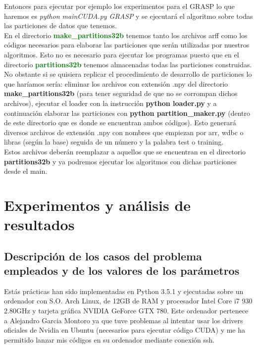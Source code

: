 \documentclass[10pt,a4paper]{article}
\begin{document}
Entonces para ejecutar por ejemplo los experimentos para el GRASP lo que haremos es \textit{python mainCUDA.py GRASP} y se ejecutará el algoritmo sobre todas las particiones de datos que tenemos.\\

En el directorio \textbf{\textcolor{green}{make\_partitions32b}} tenemos tanto los archivos arff como los códigos necesarios para elaborar las particiones que serán utilizadas por nuestros algoritmos. Esto no es necesario para ejecutar los programas puesto que en el directorio \textbf{\textcolor{green}{partitions32b}} tenemos almacenadas todas las particiones construidas. No obstante si se quisiera replicar el procedimiento de desarrollo de particiones lo que haríamos sería: eliminar los archivos con extensión .npy del directorio \textbf{make\_partitions32b} (para tener seguridad de que no se corrompan dichos archivos), ejecutar el loader con la instrucción \textbf{python loader.py} y a continuación elaborar las particiones con \textbf{python partition\_maker.py} (dentro de este directorio que es donde se encuentran ambos códigos). Esto generará diversos archivos de extensión .npy con nombres que empiezan por arr, wdbc o libras (según la base) seguida de un número y la palabra test o training.\\

Estos archivos deberán reemplazar a aquellos que se encuentran en el directorio \textbf{partitions32b} y ya podremos ejecutar los algoritmos con dichas particiones desde el main.\\

\newpage
\section{\color[rgb]{0.0,0.0,0.21}Experimentos y análisis de resultados}

\subsection{\color[rgb]{0.0,0.0,0.51}Descripción de los casos del problema empleados y de los valores de los parámetros}


Estás prácticas han sido implementadas en Python 3.5.1 y ejecutadas sobre un ordenador con S.O. Arch Linux, de 12GB de RAM y procesador Intel Core i7 930 2.80GHz y tarjeta gráfica NVIDIA GeForce GTX 780. Este ordenador pertenece a Alejandro Garcia Montoro ya que tuve problemas al intentar usar los drivers oficiales de Nvidia en Ubuntu (necesarios para ejecutar código CUDA) y me ha permitido lanzar mis códigos en su ordenador mediante conexión ssh.\\
\end{document}
